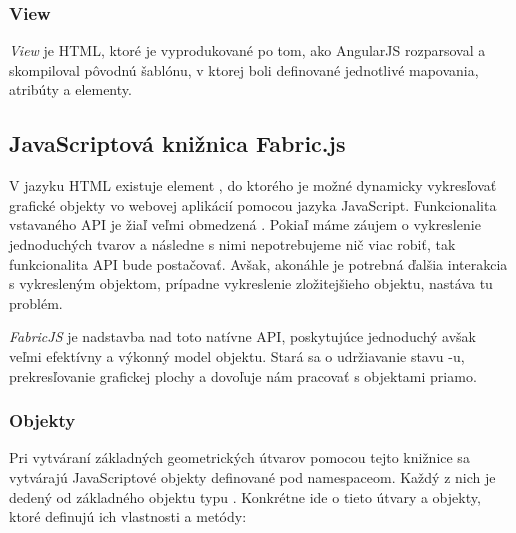 \subsubsection{View}
\textit{View} je HTML, ktoré je vyprodukované po tom, ako AngularJS rozparsoval a skompiloval pôvodnú šablónu, v ktorej boli definované jednotlivé mapovania, atribúty a elementy.

\subsection{JavaScriptová knižnica Fabric.js}

V jazyku HTML existuje element , do ktorého je možné dynamicky vykresľovať grafické objekty vo webovej aplikácií pomocou jazyka JavaScript. Funkcionalita vstavaného API je žiaľ veľmi obmedzená \cite{cabanier2014html}. Pokiaľ máme záujem o vykreslenie jednoduchých tvarov a následne s nimi nepotrebujeme nič viac robiť, tak funkcionalita API bude postačovať. Avšak, akonáhle je potrebná ďalšia interakcia s vykresleným objektom, prípadne vykreslenie zložitejšieho objektu, nastáva tu problém.

\textit{FabricJS} je nadstavba nad toto natívne API, poskytujúce jednoduchý avšak veľmi efektívny a výkonný model objektu. Stará sa o udržiavanie stavu -u, prekresľovanie grafickej plochy a dovoľuje nám pracovať s objektami priamo.

\subsubsection{Objekty}

Pri vytváraní základných geometrických útvarov pomocou tejto knižnice sa vytvárajú JavaScriptové objekty definované pod  namespaceom. Každý z nich je dedený od základného  objektu typu . Konkrétne ide o tieto útvary a objekty, ktoré definujú ich vlastnosti a metódy:

